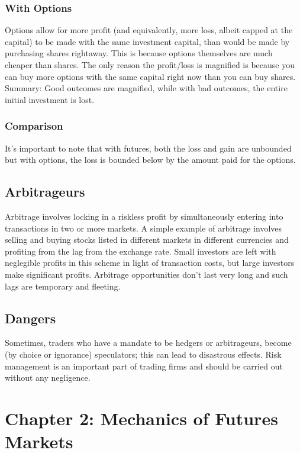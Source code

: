 \documentclass{article}
\begin{document}
\subsubsection{With Options}
Options allow for more profit (and equivalently, more loss, albeit capped at
the capital) to be made with the same investment capital,
than would be made by purchasing shares rightaway. This is because options themselves are much cheaper
than shares. The only reason the profit/loss is magnified is because you can buy more options with the
same capital right now than you can buy shares. Summary: Good outcomes are magnified, while with
bad outcomes, the entire initial investment is lost.
\subsubsection{Comparison}
It's important to note that with futures, both the loss and gain are unbounded but with options, the 
loss is bounded below by the amount paid for the options.
\subsection{Arbitrageurs}
Arbitrage involves locking in a riskless profit by simultaneously entering into transactions in two or
more markets. A simple example of arbitrage involves selling and buying stocks listed in different
markets in different currencies and profiting from the lag from the exchange rate. Small investors
are left with neglegible profits in this scheme in light of transaction costs, but large investors
make significant profits. Arbitrage opportunities don't last very long and such lags are temporary
and fleeting.
\subsection{Dangers}
Sometimes, traders who have a mandate to be hedgers or arbitrageurs, become (by
choice or ignorance) speculators; this can lead to disastrous effects. Risk management
is an important part of trading firms and should be carried out without any negligence.
\section{Chapter 2: Mechanics of Futures Markets}
\end{document}
